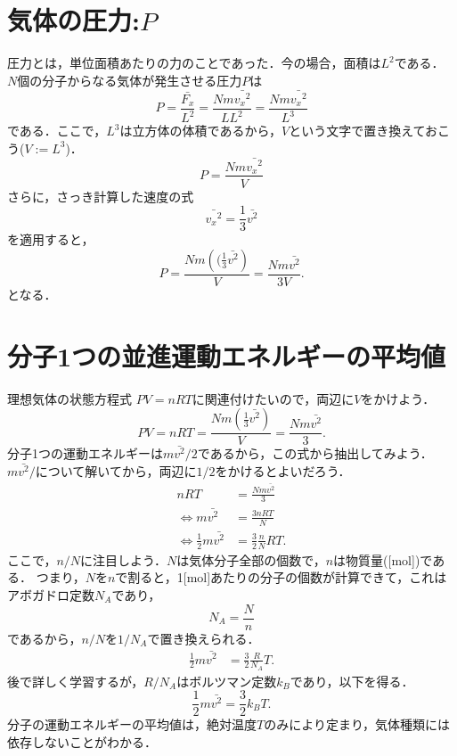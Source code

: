     \section{気体の圧力:$P$}
    圧力とは，単位面積あたりの力のことであった．今の場合，面積は${L}^{2}$である．
    $N$個の分子からなる気体が発生させる圧力$P$は
    \[
        P = \frac{\bar{{F}_{x}}}{{L}^{2}} = \frac{Nm\bar{{{v}_{x}}^{2}}}{L{L}^{2}} = \frac{Nm\bar{{{v}_{x}}^{2}}}{{L}^{3}}
    \]
    である．ここで，${L}^{3}$は立方体の体積であるから，$V$という文字で置き換えておこう($V:={L}^{3}$)．
    \[
        P = \frac{Nm\bar{{{v}_{x}}^{2}}}{V}
    \]
    さらに，さっき計算した速度の式
    \[
        \bar{{{v}_{x}}^{2}} = \frac{1}{3} \bar{{v}^{2}}
    \]
    を適用すると，
    \[
        P = \frac{Nm \left((\frac{1}{3} \bar{{v}^{2}}\right)}{V} =\frac{Nm\bar{{v}^{2}}}{3V}.
    \]
    となる．

    \section{分子1つの並進運動エネルギーの平均値}
    理想気体の状態方程式 $PV=nRT$に関連付けたいので，両辺に$V$をかけよう．
    \[
        PV = nRT =  \frac{Nm \left(\frac{1}{3} \bar{{v}^{2}}\right)}{V} =\frac{Nm\bar{{v}^{2}}}{3}.
    \]
    分子1つの運動エネルギーは$m\bar{{v}^{2}}/2$であるから，この式から抽出してみよう．
    $m\bar{{v}^{2}}/$について解いてから，両辺に$1/2$をかけるとよいだろう．
    \begin{align*}
                                   nRT &= \frac{Nm\bar{{v}^{2}}}{3} \\
        \Leftrightarrow m\bar{{v}^{2}} &= \frac{3nRT}{N} \\
        \Leftrightarrow \frac{1}{2}m\bar{{v}^{2}} &= \frac{3}{2} \frac{n}{N}RT.
    \end{align*}
    ここで，$n/N$に注目しよう．$N$は気体分子全部の個数で，$n$は物質量([mol])である．
    つまり，$N$を$n$で割ると，1[mol]あたりの分子の個数が計算できて，これはアボガドロ定数${N}_{A}$であり，
    \[
        {N}_{A} = \frac{N}{n}
    \]
    であるから，$n/N$を$1/{N}_{A}$で置き換えられる．
    \begin{align*}
        \frac{1}{2}m\bar{{v}^{2}} &= \frac{3}{2} \frac{R}{{N}_{A}}T.
    \end{align*}
    後で詳しく学習するが，$R/{N}_{A}$はボルツマン定数${k}_{B}$であり，以下を得る．
    \begin{equation}
        \frac{1}{2}m\bar{{v}^{2}} = \frac{3}{2} {k}_{B}T.
    \end{equation}
    分子の運動エネルギーの平均値は，絶対温度$T$のみにより定まり，気体種類には依存しないことがわかる．

